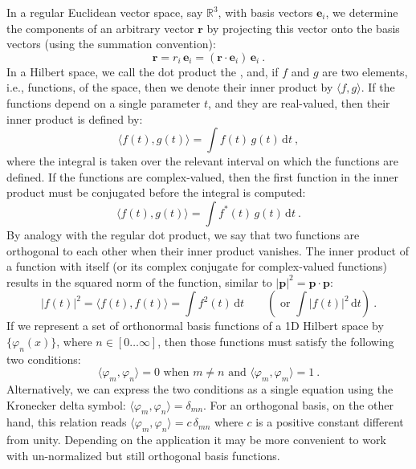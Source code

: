 In a regular Euclidean vector space, say $\mathbb{R}^3$, with basis vectors $\mathbf{e}_i$, we determine the components of an arbitrary vector $\mathbf{r}$ by projecting this vector onto the basis vectors (using the summation convention):
\[
	\mathbf{r} = r_i\,\mathbf{e}_i =  (\mathbf{r}\cdot\mathbf{e}_i)\,\mathbf{e}_i\ .
\]
In a Hilbert space, we call the dot product the , and, if $f$ and $g$ are two elements, i.e., functions, of the space, then we denote their inner product by $\langle f,g\rangle$. If the functions depend on a single parameter $t$, and they are real-valued, then their inner product is defined by:
\begin{equation}
	\langle f(t),g(t)\rangle = \int f(t)\,g(t)\,\mathrm{d}t\ ,
\end{equation}
where the integral is taken over the relevant interval on which the functions are defined.  If the functions are complex-valued, then the first function in the inner product must be conjugated before the integral is computed:
\begin{equation}
	\langle f(t),g(t)\rangle = \int f^{\ast}(t)\,g(t)\,\mathrm{d}t\ .
\end{equation}
By analogy with the regular dot product, we say that two functions are orthogonal to each other when their inner product vanishes.  The inner product of a function with itself (or its complex conjugate for complex-valued functions) results in the squared norm of the function, similar to $\vert\mathbf{p}\vert^2=\mathbf{p}\cdot\mathbf{p}$:
\begin{equation}
	\vert f(t)\vert^2 = \langle f(t),f(t) \rangle = \int f^2(t)\,\mathrm{d}t\qquad\left(\text{ or }\int \vert f(t)\vert^2\,\mathrm{d}t\right)\ .
\end{equation}
If we represent a set of orthonormal basis functions of a 1D Hilbert space by $\{\varphi_n(x)\}$, where $n\in[0\ldots\infty]$, then those functions must satisfy the following two conditions:
\[
	\langle \varphi_m, \varphi_n\rangle = 0\text{ when $m\ne n$ and } \langle \varphi_m, \varphi_m\rangle = 1\ .
\]
Alternatively, we can express the two conditions as a single equation using the Kronecker delta symbol: $\langle \varphi_m, \varphi_n\rangle = \delta_{mn}$.  For an orthogonal basis, on the other hand, this relation reads $\langle \varphi_m, \varphi_n\rangle = c\,\delta_{mn}$ where $c$ is a positive constant different from unity.  Depending on the application it may be more convenient to work with un-normalized but still orthogonal basis functions.


